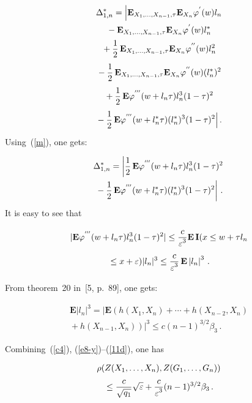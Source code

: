 \begin{multicols}{2}
    \noindent
    \begin{multline*}
    \Delta^{*}_{1,n}=
    \Big|\mathbf{E}_{X_1,\ldots,X_{n-1},\tau} \mathbf{E}_{X_{n}}\varphi^{'}(w)l_n\\
    {}-
    \mathbf{E}_{X_1,\ldots,X_{n-1},\tau}
    \mathbf{E}_{X_{n}}\varphi^{'}(w)l_n^{*}\\
{}+\displaystyle\frac{\displaystyle 1\mathstrut}{\displaystyle 2\mathstrut}\,
    \mathbf{E}_{X_1,\ldots,X_{n-1},\tau} \mathbf{E}_{X_{n}}\varphi^{''}(w)l_n^2\\
    {}-
    \displaystyle\frac{\displaystyle 1\mathstrut}{\displaystyle 2\mathstrut}\,\mathbf{E}_{X_1,\ldots,X_{n-1},\tau} \mathbf{E}_{X_{n}}\varphi^{''}(w)(l_n^{*})^2\\
{}+
    \displaystyle\frac{\displaystyle 1\mathstrut}{\displaystyle 2\mathstrut}\,\mathbf{E}\varphi^{'''}(w+l_n\tau )l_n^3(1-\tau)^{2}\\
    {}-
    \displaystyle\frac{\displaystyle 1\mathstrut}{\displaystyle 2\mathstrut}\,\mathbf{E}\varphi^{'''}(w+l_n^{*}\tau)(l_n^{*})^3(1-\tau)^{2}\Big|\,.
    \end{multline*}
    Using~(\ref{m}), one gets:
    
    \noindent
     \begin{multline}
     \label{e11-y}
    \Delta^{*}_{1,n}=\left\vert\displaystyle\frac{\displaystyle 1\mathstrut}{\displaystyle 2\mathstrut}\,\mathbf{E}\varphi^{'''}(w+l_n\tau)l_n^3(1-\tau)^{2}\right.\\
\left.    {}-
    \displaystyle\frac{\displaystyle 1\mathstrut}{\displaystyle 2\mathstrut}\,\mathbf{E}\varphi^{'''}(w+l_n^{*}\tau)(l_n^{*})^3(1-\tau)^{2}\right\vert\,.
    \end{multline}
    It is easy to see that
    
    \noindent
    \begin{multline*}
    |\mathbf{E}\varphi^{'''}(w+l_n\tau)l_n^3(1-\tau)^{2}|\leq 
    \displaystyle\frac{\displaystyle c\mathstrut}{\displaystyle \varepsilon^{3}\mathstrut}\mathbf{E} \,    \mathbf{I}(x\leq w+\tau l_n\\
    {}\leq x
    +\varepsilon)|l_{n}|^{3}\leq \displaystyle\frac{\displaystyle c\mathstrut}{\displaystyle \varepsilon^{3}\mathstrut}\,\mathbf{E} 
    \left\vert l_{n}\right\vert^{3}\,.
    \end{multline*}

    From theorem~20 in~[5, p.~89], one gets:
    
    \noindent
     \begin{multline}
     \label{11d}
     \mathbf{E}|l_{n}|^{3}=\left\vert\mathbf{E}\left(h(X_1,X_n)+
     \cdots+h(X_{n-2},X_n)\right.\right.\\
\left.\left.     {}+h(X_{n-1},X_n)\right)\right\vert^{3}
    \leq c(n-1)^{3/2}\beta_3\,.
    \end{multline}
    

   Combining~(\ref{c4}), (\ref{e8-y})--(\ref{11d}), one has
   
   \noindent
   \begin{multline*}
   \rho(Z(X_1,\ldots,X_n),Z(G_1,\ldots,G_n))\\
   {}\leq 
   \displaystyle\frac{\displaystyle c\mathstrut}{\displaystyle \sqrt{q_1}\mathstrut}\sqrt{\varepsilon}+\displaystyle\frac{\displaystyle c\mathstrut}{\displaystyle \varepsilon^{3}\mathstrut}(n-1)^{3/2}\beta_3\,.
   \end{multline*}
   

\end{multicols}
